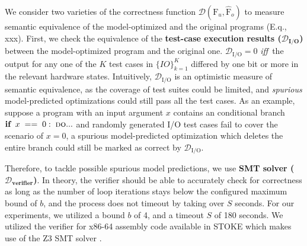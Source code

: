 \documentclass{article}
\newcommand\p{\ensuremath{{\mathrm{F}_u}}}
\def\correctfuncio/{\ensuremath{\mathcal{D}_\textrm{I/O}}}
\begin{document}
We consider two varieties of the correctness function $\mathcal{D}(\p, \hat{\mathrm{F}}_o)$ to measure semantic equivalence of the model-optimized and the original programs  (E.q., xxx). 
First, we check the equivalence of the \textbf{test-case execution results ({$\bm{\mathcal{D}_\textbf{I/O}}$})} between the model-optimized program and the original one. 
$\correctfuncio/=0$ \textit{iff}~the output for any one of the $K$ test cases in $\{ IO \}_{k=1}^K$ differed by one bit or more in the relevant hardware states.
Intuitively, \correctfuncio/ is an optimistic measure of semantic equivalence, as the coverage of test suites could be limited, and \emph{spurious} model-predicted optimizations could still pass all the test cases.
As an example, suppose a program with an input argument $x$ contains an conditional branch $\textbf{if} \;\; x\;==\;0:\; \textsc{do}...$ and randomly generated I/O test cases fail to cover the scenario of $x=0$, a spurious model-predicted optimization which deletes the entire branch could still be marked as correct by \correctfuncio/.

Therefore, to tackle possible spurious model predictions, we use \textbf{SMT solver ($\bm{\mathcal{D}_\textbf{verifier}}$)}.
In theory, the verifier should be able to accurately check for correctness as long as the number of loop iterations stays below the configured maximum bound of $b$, and the process does not timeout by taking over $S$ seconds. For our experiments, we utilized a bound $b$ of 4, and a timeout $S$ of 180 seconds. 
We utilized the verifier for x86-64 assembly code available in \textsc{STOKE} which makes use of the Z3 SMT solver \cite{churchill2017sound, de2008z3}. 
\end{document}
